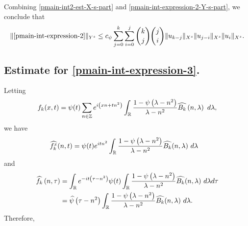 %
%
Combining \eqref{pmain-int2-est-X-s-part} and
\eqref{pmain-int-expression-2-Y-s-part}, we conclude that
%
%
%
%
\begin{equation}
  \label{pmain-int2-est}
  \begin{split}
    \|\eqref{pmain-int-expression-2}\|_{Y^s} \le c_{\psi}
    \sum_{j=0}^{k} \sum_{i=0}^{j} {k \choose j}{j \choose i}
    \|u_{k-j}\|_{X^s} \| u_{j-i}\|_{X^s}
    \| u_i \|_{X^s}.
  \end{split}
\end{equation}
%
%
\subsection{Estimate for \eqref{pmain-int-expression-3}.}
Letting $$f_k(x,t) = \psi(t) \sum_{n \in \mathbb{Z}} e^{i\left( xn + tn^{2} \right)} 
\int_{\mathbb{R}} \frac{1 - \psi\left( \lambda - n^{2} \right)}{\lambda - n^{2}} 
\widehat{{B_k}} \left( n, \lambda \right) \ d \lambda,$$ we have
%
%
\begin{equation*}
  \begin{split}
    & \widehat{f_k^x}(n, t) = \psi(t) e^{itn^{2}} \int_{\mathbb{R}}
    \frac{1 - \psi\left( \lambda - n^{2} \right)}{\lambda - n^{2}} 
    \widehat{{B_k}}(n, \lambda) \ d \lambda
  \end{split}
\end{equation*}
and
\begin{equation*}
  \begin{split}
     \widehat{f_k}\left( n, \tau \right)
     & = \int_{\mathbb{R}} e^{-it\left( \tau - n^{2} 
    \right)} \psi(t) \int_{\mathbb{R}} \frac{1 - \psi\left( 
    \lambda - n^{2} 
    \right)}{\lambda - n^{2}} \widehat{{B_k}}(n, \lambda) \ d \lambda d \tau
    \\
    & = \widehat{\psi}\left( \tau - n^{2} \right) \int_{\mathbb{R}} 
    \frac{1 - \psi\left( 
    \lambda - n^{2} 
    \right)}{\lambda - n^{2}} \widehat{{B_k}}(n, \lambda) \ d \lambda.
  \end{split}
\end{equation*}
Therefore,
%
%
